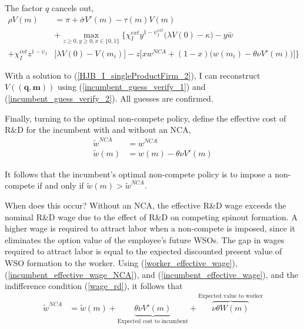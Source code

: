 \documentclass[12pt,english]{article}
\theoremstyle{remark}
\begin{document}
The factor $q$ cancels out, 
\begin{align}
		\rho V(m) &= \pi + \bar{\sigma} V'(m)  - \tau(m) V(m) \nonumber \\ 
	& + \max_{z \ge 0, y \ge 0, x \in \{0,1\}} \Bigg\{ \chi_I^{ext} y^{1-\psi_I^{ext}} \Big( \lambda V(0) - \kappa \Big) - y \bar{w} \nonumber \\
	+  \chi_I^{int} z^{1-\psi_I} &\Bigg[ \lambda V(0) - V(m_i) \Bigg] - z \Bigg[ x w^{NCA} + (1-x) \Big( w(m_i) - \theta \nu V'(m)\Big) \Bigg] \Bigg\} \label{HJB_I_singleProductFirm_2}
\end{align}

With a solution to (\ref{HJB_I_singleProductFirm_2}), I can reconstruct $V(\mathbf{(q,m)})$ using (\ref{incumbent_guess_verify_1}) and (\ref{incumbent_guess_verify_2}). All guesses are confirmed. 

Finally, turning to the optimal non-compete policy, define the effective cost of R\&D for the incumbent with and without an NCA,
\begin{align}
	\tilde{w}^{NCA} &= w^{NCA}  \label{incumbent_effective_wage_NCA} \\
	\tilde{w}(m) &= w(m) - \theta \nu V'(m)  \label{incumbent_effective_wage}
\end{align}

It follows that the incumbent's optimal non-compete policy is to impose a non-compete if and only if $\tilde{w}(m) > \tilde{w}^{NCA}$. 

When does this occur? Without an NCA, the effective R\&D wage exceeds the nominal R\&D wage due to the effect of R\&D on competing spinout formation. A higher wage is required to attract labor when a non-compete is imposed, since it eliminates the option value of the employee's future WSOs. The gap in wages required to attract labor is equal to the expected discounted present value of WSO formation to the worker. Using (\ref{worker_effective_wage}), (\ref{incumbent_effective_wage_NCA}), and (\ref{incumbent_effective_wage}), and the indifference condition (\ref{wage_rd}), it follows that
\begin{align}
	\tilde{w}^{NCA} &= \tilde{w}(m) + \underbrace{\theta \nu V'(m)}_{\textrm{Expected cost to incumbent}} + \overbrace{\nu \theta W(m) }^{\textrm{Expected value to worker}}
\end{align} 
\end{document}
